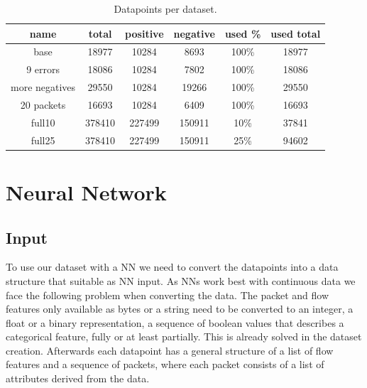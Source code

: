 \documentclass[
	ngerman,
	ruledheaders=section,%
	class=report,%
	thesis={type=bachelor},%
	accentcolor=9c,%
	custommargins=true,%
	marginpar=false,%
	parskip=half-,%
	fontsize=11pt,%
]{tudapub}
\begin{document}
\begin{table}
    \centering
    \begin{tabular}{|c|c|c|c|c|c|}
        \hline
        \textbf{name} & \textbf{total} & \textbf{positive} & \textbf{negative} & \textbf{used \%} & \textbf{used total} \\
        \hline
        base & 18977 & 10284 & 8693 & 100\% & 18977 \\
        \hline
        9 errors & 18086 & 10284 & 7802 & 100\% & 18086 \\
        \hline
        more negatives & 29550 & 10284 & 19266 & 100\% & 29550 \\
        \hline
        20 packets & 16693 & 10284 & 6409 & 100\% & 16693 \\
        \hline
        full10 & 378410 & 227499 & 150911 & 10\% & 37841 \\
        \hline
        full25 & 378410 & 227499 & 150911 & 25\% & 94602 \\
        \hline
    \end{tabular}
    \caption{Datapoints per dataset.}
    \label{tab:datapoints}
\end{table}

\section{Neural Network}
\label{sec:NN}

\subsection{Input}
\label{sec:NNinput}

To use our dataset with a NN we need to convert the datapoints into a data structure that suitable as NN input.
As NNs work best with continuous data we face the following problem when converting the data.
The packet and flow features only available as bytes or a string need to be converted to an integer, a float or a binary representation, a sequence of boolean values that describes a categorical feature, fully or at least partially.
This is already solved in the dataset creation.
Afterwards each datapoint has a general structure of a list of flow features and a sequence of packets, where each packet consists of a list of attributes derived from the data.
\end{document}
